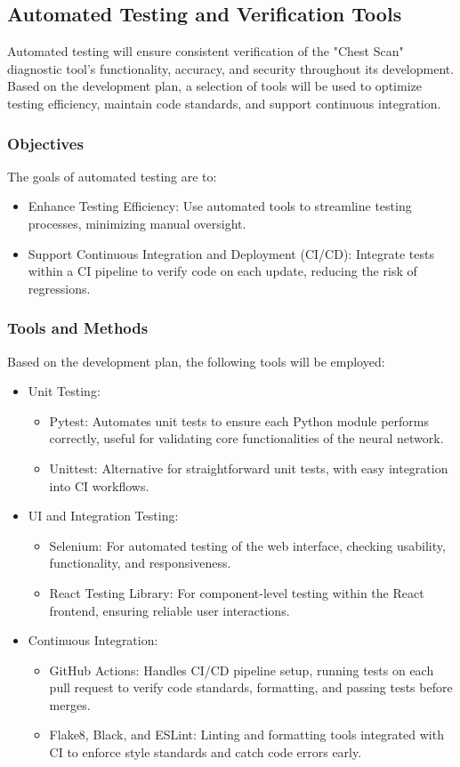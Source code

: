 \documentclass[12pt, titlepage]{article}
\begin{document}
\subsection{Automated Testing and Verification Tools}
Automated testing will ensure consistent verification of the "Chest Scan" diagnostic tool’s functionality, accuracy, and security throughout its development. Based on the development plan, a selection of tools will be used to optimize testing efficiency, maintain code standards, and support continuous integration.

\subsubsection{Objectives}
The goals of automated testing are to:
\begin{itemize}
  \item Enhance Testing Efficiency: Use automated tools to streamline testing processes, minimizing manual oversight.
  \item Support Continuous Integration and Deployment (CI/CD): Integrate tests within a CI pipeline to verify code on each update, reducing the risk of regressions.
\end{itemize}

\subsubsection{Tools and Methods}
Based on the development plan, the following tools will be employed:
\begin{itemize}
  \item Unit Testing:
    \begin{itemize}
      \item Pytest: Automates unit tests to ensure each Python module performs correctly, useful for validating core functionalities of the neural network.
      \item Unittest: Alternative for straightforward unit tests, with easy integration into CI workflows.
    \end{itemize}
  \item UI and Integration Testing:
    \begin{itemize}
      \item Selenium: For automated testing of the web interface, checking usability, functionality, and responsiveness.
      \item React Testing Library: For component-level testing within the React frontend, ensuring reliable user interactions.
    \end{itemize}
  \item Continuous Integration:
    \begin{itemize}
      \item GitHub Actions: Handles CI/CD pipeline setup, running tests on each pull request to verify code standards, formatting, and passing tests before merges.
      \item Flake8, Black, and ESLint: Linting and formatting tools integrated with CI to enforce style standards and catch code errors early.
    \end{itemize}
\end{itemize}
\end{document}
